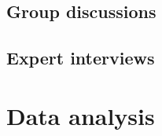 

\subsection{Group discussions}
\label{chapter3-group-discussions}

\subsection{Expert interviews}
\label{chapter3-expert-interviews}

\section{Data analysis}
\label{data-analysis}


